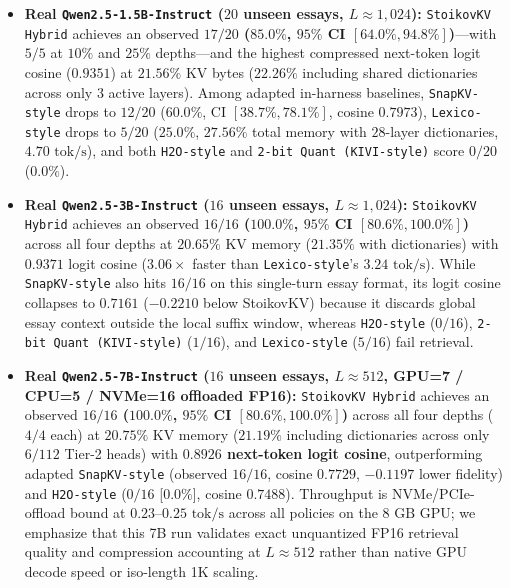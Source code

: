 \documentclass[conference]{IEEEtran}
\begin{document}
\begin{itemize}
    \item \textbf{Real \texttt{Qwen2.5-1.5B-Instruct} ($20$ unseen essays, $L \approx 1{,}024$):} \texttt{StoikovKV Hybrid} achieves an observed \textbf{$17/20$ ($85.0\%$, $95\%$ CI $[64.0\%, 94.8\%]$)}---with $5/5$ at $10\%$ and $25\%$ depths---and the highest compressed next-token logit cosine ($0.9351$) at $21.56\%$ KV bytes ($22.26\%$ including shared dictionaries across only $3$ active layers). Among adapted in-harness baselines, \texttt{SnapKV-style} drops to $12/20$ ($60.0\%$, CI $[38.7\%, 78.1\%]$, cosine $0.7973$), \texttt{Lexico-style} drops to $5/20$ ($25.0\%$, $27.56\%$ total memory with $28$-layer dictionaries, $4.70\text{ tok/s}$), and both \texttt{H2O-style} and \texttt{2-bit Quant (KIVI-style)} score $0/20$ ($0.0\%$).
    \item \textbf{Real \texttt{Qwen2.5-3B-Instruct} ($16$ unseen essays, $L \approx 1{,}024$):} \texttt{StoikovKV Hybrid} achieves an observed \textbf{$16/16$ ($100.0\%$, $95\%$ CI $[80.6\%, 100.0\%]$)} across all four depths at $20.65\%$ KV memory ($21.35\%$ with dictionaries) with $0.9371$ logit cosine ($3.06\times$ faster than \texttt{Lexico-style}'s $3.24\text{ tok/s}$). While \texttt{SnapKV-style} also hits $16/16$ on this single-turn essay format, its logit cosine collapses to $0.7161$ ($-0.2210$ below StoikovKV) because it discards global essay context outside the local suffix window, whereas \texttt{H2O-style} ($0/16$), \texttt{2-bit Quant (KIVI-style)} ($1/16$), and \texttt{Lexico-style} ($5/16$) fail retrieval.
    \item \textbf{Real \texttt{Qwen2.5-7B-Instruct} ($16$ unseen essays, $L \approx 512$, GPU=7 / CPU=5 / NVMe=16 offloaded FP16):} \texttt{StoikovKV Hybrid} achieves an observed \textbf{$16/16$ ($100.0\%$, $95\%$ CI $[80.6\%, 100.0\%]$)} across all four depths ($4/4$ each) at $20.75\%$ KV memory ($21.19\%$ including dictionaries across only $6/112$ Tier-2 heads) with \textbf{$0.8926$ next-token logit cosine}, outperforming adapted \texttt{SnapKV-style} (observed $16/16$, cosine $0.7729$, $-0.1197$ lower fidelity) and \texttt{H2O-style} ($0/16$ [$0.0\%$], cosine $0.7488$). Throughput is NVMe/PCIe-offload bound at $0.23$--$0.25\text{ tok/s}$ across all policies on the $8\text{ GB}$ GPU; we emphasize that this 7B run validates exact unquantized FP16 retrieval quality and compression accounting at $L \approx 512$ rather than native GPU decode speed or iso-length 1K scaling.
\end{itemize}
\end{document}
